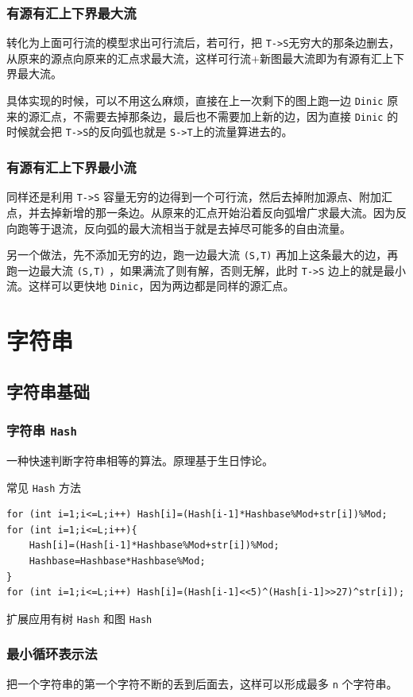 \documentclass[UTF-8]{ctexart}
\begin{document}
	\subsubsection{有源有汇上下界最大流}
	
	转化为上面可行流的模型求出可行流后，若可行，把 \texttt{T->S}无穷大的那条边删去，从原来的源点向原来的汇点求最大流，这样可行流+新图最大流即为有源有汇上下界最大流。  
	
	具体实现的时候，可以不用这么麻烦，直接在上一次剩下的图上跑一边 \texttt{Dinic} 原来的源汇点，不需要去掉那条边，最后也不需要加上新的边，因为直接 \texttt{Dinic} 的时候就会把 \texttt{T->S}的反向弧也就是 \texttt{S->T}上的流量算进去的。
	
	\subsubsection{有源有汇上下界最小流}
	
	同样还是利用 \texttt{T->S} 容量无穷的边得到一个可行流，然后去掉附加源点、附加汇点，并去掉新增的那一条边。从原来的汇点开始沿着反向弧增广求最大流。因为反向跑等于退流，反向弧的最大流相当于就是去掉尽可能多的自由流量。  
	
	另一个做法，先不添加无穷的边，跑一边最大流 \texttt{(S,T)} 再加上这条最大的边，再跑一边最大流 \texttt{(S,T)} ，如果满流了则有解，否则无解，此时 \texttt{T->S} 边上的就是最小流。这样可以更快地 \texttt{Dinic}，因为两边都是同样的源汇点。
	\newpage
\section{字符串}
	\subsection{字符串基础}
	\subsubsection{字符串 \texttt{Hash}}
	一种快速判断字符串相等的算法。原理基于生日悖论。
	
	常见 \texttt{Hash} 方法
\begin{verbatim}
for (int i=1;i<=L;i++) Hash[i]=(Hash[i-1]*Hashbase%Mod+str[i])%Mod;
for (int i=1;i<=L;i++){
    Hash[i]=(Hash[i-1]*Hashbase%Mod+str[i])%Mod;
    Hashbase=Hashbase*Hashbase%Mod;
}
for (int i=1;i<=L;i++) Hash[i]=(Hash[i-1]<<5)^(Hash[i-1]>>27)^str[i]);
\end{verbatim}
	扩展应用有树 \texttt{Hash} 和图 \texttt{Hash}
	\subsubsection{最小循环表示法}
	把一个字符串的第一个字符不断的丢到后面去，这样可以形成最多 \texttt{n} 个字符串。
	
\end{document}
